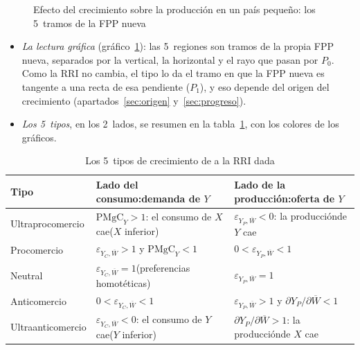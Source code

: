 \documentclass[11pt]{article}
\begin{document}
\begin{figure}[H]
\centering
\caption{Efecto del crecimiento sobre la producción en un país pequeño: los 5~tramos de la FPP nueva}\label{fig:produccion}
\end{figure}
\begin{itemize}
\item \emph{La lectura gráfica} (gráfico~\ref{fig:produccion}): las 5~regiones son tramos de la propia FPP nueva, separados por la vertical, la horizontal y el rayo que pasan por $P_0$. Como la RRI no cambia, el tipo lo da el tramo en que la FPP nueva es tangente a una recta de esa pendiente ($P_1$), y eso depende del origen del crecimiento (apartados~\ref{sec:origen} y~\ref{sec:progreso}).
\item \emph{Los 5~tipos}, en los 2~lados, se resumen en la tabla~\ref{tab:sesgos}, con los colores de los gráficos.
\end{itemize}
\begin{table}[H]
\centering
\caption{Los 5~tipos de crecimiento de  a la RRI dada}\label{tab:sesgos}
\small
\begin{tabular}{>{\centering\arraybackslash}m{3.0cm}>{\centering\arraybackslash}m{5.4cm}>{\centering\arraybackslash}m{5.4cm}}
\toprule
\rowcolor{tceeazulpalido}\textbf{Tipo} & \textbf{Lado del consumo:\newline demanda de $Y$} & \textbf{Lado de la producción:\newline oferta de $Y$}\\
\midrule
\textcolor{tceerojo}{Ultraprocomercio} & $\mathrm{PMgC}_Y>1$: el consumo de $X$ cae\newline($X$ inferior) & $\varepsilon_{Y_P,\overline W}<0$: la producción\newline de $Y$ cae\\
\addlinespace[0.3em]
\textcolor{tceedorado}{Procomercio} & $\varepsilon_{Y_C,\overline W}>1$ y $\mathrm{PMgC}_Y<1$ & $0<\varepsilon_{Y_P,\overline W}<1$\\
\addlinespace[0.3em]
\cellcolor{tceesalvia}Neutral & \cellcolor{tceesalvia}$\varepsilon_{Y_C,\overline W}=1$\newline(preferencias homotéticas) & \cellcolor{tceesalvia}$\varepsilon_{Y_P,\overline W}=1$\\
\addlinespace[0.3em]
\textcolor{tceeazul}{Anticomercio} & $0<\varepsilon_{Y_C,\overline W}<1$ & $\varepsilon_{Y_P,\overline W}>1$ y $\partial Y_P/\partial\overline W<1$\\
\addlinespace[0.3em]
\textcolor{tceeverde}{Ultraanticomercio} & $\varepsilon_{Y_C,\overline W}<0$: el consumo de $Y$ cae\newline($Y$ inferior) & $\partial Y_P/\partial\overline W>1$: la producción\newline de $X$ cae\\
\bottomrule
\end{tabular}
\end{table}
\end{document}
